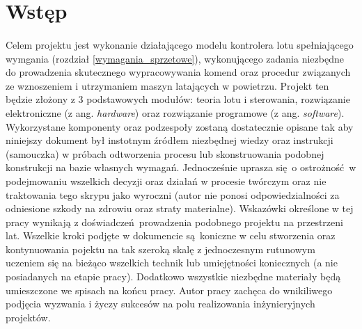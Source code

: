 \section{Wstęp}
\paragraph{}Celem projektu jest wykonanie działającego modelu kontrolera lotu spełniającego wymgania (rozdział \ref{wymagania_sprzetowe}), wykonującego zadania niezbędne do prowadzenia skutecznego wypracowywania komend oraz procedur związanych ze wznoszeniem i utrzymaniem maszyn latających w powietrzu. Projekt ten będzie złożony z 3 podstawowych modułów: teoria lotu i sterowania, rozwiązanie elektroniczne (z ang. \textit{hardware}) oraz rozwiązanie programowe (z ang. \textit{software}). Wykorzystane komponenty oraz podzespoły zostaną dostatecznie opisane tak aby niniejszy dokument był instotnym źródłem niezbędnej wiedzy oraz instrukcji (samouczka) w próbach odtworzenia procesu lub skonstruowania podobnej konstrukcji na bazie własnych wymagań. Jednocześnie uprasza się o ostrożność w podejmowaniu wszelkich decyzji oraz działań w procesie twórczym oraz nie traktowania tego skrypu jako wyroczni (autor nie ponosi odpowiedzialności za odniesione szkody na zdrowiu oraz straty materialne). Wskazówki określone w tej pracy wynikają z doświadczeń prowadzenia podobnego projektu na przestrzeni lat. Wszelkie kroki podjęte w dokumencie są koniczne w celu stworzenia oraz kontynuowania pojektu na tak szeroką skalę z jednoczesnym rutunowym uczeniem się na bieżąco wszelkich technik lub umiejętności koniecznych (a nie posiadanych na etapie pracy). Dodatkowo wszystkie niezbędne materiały będą umieszczone we spisach na końcu pracy. Autor pracy zachęca do wnikiliwego podjęcia wyzwania i życzy sukcesów na polu realizowania inżynieryjnych projektów.
